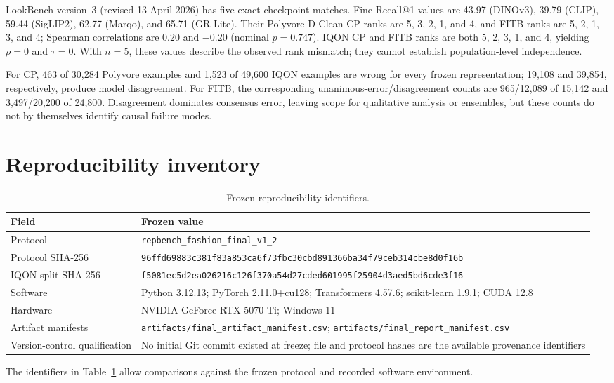 \documentclass[pdflatex,sn-mathphys-num,iicol]{sn-jnl}
\begin{document}
LookBench version~3 (revised 13 April 2026) has five exact checkpoint matches. Fine Recall@1 values are 43.97 (DINOv3), 39.79 (CLIP), 59.44 (SigLIP2), 62.77 (Marqo), and 65.71 (GR-Lite). Their Polyvore-D-Clean CP ranks are 5, 3, 2, 1, and 4, and FITB ranks are 5, 2, 1, 3, and 4; Spearman correlations are 0.20 and $-0.20$ (nominal $p=0.747$). IQON CP and FITB ranks are both 5, 2, 3, 1, and 4, yielding $\rho=0$ and $\tau=0$. With $n=5$, these values describe the observed rank mismatch; they cannot establish population-level independence.

For CP, 463 of 30,284 Polyvore examples and 1,523 of 49,600 IQON examples are wrong for every frozen representation; 19,108 and 39,854, respectively, produce model disagreement. For FITB, the corresponding unanimous-error/disagreement counts are 965/12,089 of 15,142 and 3,497/20,200 of 24,800. Disagreement dominates consensus error, leaving scope for qualitative analysis or ensembles, but these counts do not by themselves identify causal failure modes.

\section{Reproducibility inventory}

\begin{table}[h!]
\caption{Frozen reproducibility identifiers.}
\label{stab:repro}
\centering\footnotesize
\begin{tabularx}{\columnwidth}{@{}>{\raggedright\arraybackslash}p{}>{\raggedright\arraybackslash}X@{}}
\toprule
Field & Frozen value \\
\midrule
Protocol & \texttt{repbench\_fashion\_final\_v1\_2} \\
Protocol SHA-256 & \texttt{96ffd69883c381f83a853ca6f73fbc30}\newline\texttt{cbd891366ba34f79ceb314cbe8d0f16b} \\
IQON split SHA-256 & \texttt{f5081ec5d2ea026216c126f370a54d27}\newline\texttt{cded601995f25904d3aed5bd6cde3f16} \\
Software & Python 3.12.13; PyTorch 2.11.0+cu128; Transformers 4.57.6; scikit-learn 1.9.1; CUDA 12.8 \\
Hardware & NVIDIA GeForce RTX 5070 Ti; Windows 11 \\
Artifact manifests & \texttt{artifacts/final\_artifact\_manifest.csv}; \texttt{artifacts/final\_report\_manifest.csv} \\
Version-control qualification & No initial Git commit existed at freeze; file and protocol hashes are the available provenance identifiers \\
\bottomrule
\end{tabularx}
\end{table}

The identifiers in Table~\ref{stab:repro} allow comparisons against the frozen protocol and recorded software environment.
\end{document}
